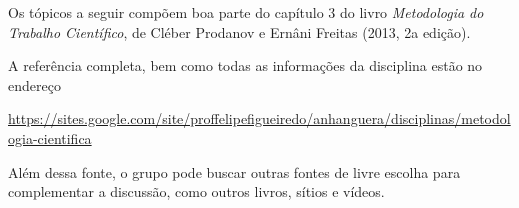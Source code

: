 \documentclass[a4paper]{article}
\begin{document}
Os tópicos a seguir compõem boa parte do capítulo 3 do livro {\em Metodologia do Trabalho Científico}, de Cléber Prodanov e Ernâni Freitas (2013, 2a edição).

A referência completa, bem como todas as informações da disciplina estão no endereço

\url{https://sites.google.com/site/proffelipefigueiredo/anhanguera/disciplinas/metodologia-cientifica}

Além dessa fonte, o grupo pode buscar outras fontes de livre escolha para complementar a discussão, como outros livros, sítios e vídeos.



\end{document}
